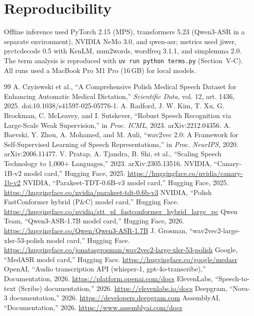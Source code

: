 \documentclass[conference]{IEEEtran}
\begin{document}
\section*{Reproducibility}
Offline inference used PyTorch 2.15 (MPS), transformers 5.23 (Qwen3-ASR in a separate environment), NVIDIA NeMo 3.0, and qwen-asr; metrics used jiwer, pyctcdecode 0.5 with KenLM, num2words, wordfreq 3.1.1, and simplemma 2.0. The term analysis is reproduced with \texttt{uv run python terms.py} (Section~V-C). All runs used a MacBook Pro M1 Pro (16\,GB) for local models.

\begin{thebibliography}{99}
 A. Czy\.zewski et al., ``A Comprehensive Polish Medical Speech Dataset for Enhancing Automatic Medical Dictation,'' \emph{Scientific Data}, vol. 12, art. 1436, 2025. doi:10.1038/s41597-025-05776-1.
 A. Radford, J. W. Kim, T. Xu, G. Brockman, C. McLeavey, and I. Sutskever, ``Robust Speech Recognition via Large-Scale Weak Supervision,'' in \emph{Proc. ICML}, 2023. arXiv:2212.04356.
 A. Baevski, Y. Zhou, A. Mohamed, and M. Auli, ``wav2vec 2.0: A Framework for Self-Supervised Learning of Speech Representations,'' in \emph{Proc. NeurIPS}, 2020. arXiv:2006.11477.
 V. Pratap, A. Tjandra, B. Shi, et al., ``Scaling Speech Technology to 1,000+ Languages,'' 2023. arXiv:2305.13516.
 NVIDIA, ``Canary-1B-v2 model card,'' Hugging Face, 2025. \url{https://huggingface.co/nvidia/canary-1b-v2}
 NVIDIA, ``Parakeet-TDT-0.6B-v3 model card,'' Hugging Face, 2025. \url{https://huggingface.co/nvidia/parakeet-tdt-0.6b-v3}
 NVIDIA, ``Polish FastConformer hybrid (P\&C) model card,'' Hugging Face. \url{https://huggingface.co/nvidia/stt_pl_fastconformer_hybrid_large_pc}
 Qwen Team, ``Qwen3-ASR-1.7B model card,'' Hugging Face, 2026. \url{https://huggingface.co/Qwen/Qwen3-ASR-1.7B}
 J. Grosman, ``wav2vec2-large-xlsr-53-polish model card,'' Hugging Face. \url{https://huggingface.co/jonatasgrosman/wav2vec2-large-xlsr-53-polish}
 Google, ``MedASR model card,'' Hugging Face. \url{https://huggingface.co/google/medasr}
 OpenAI, ``Audio transcription API (whisper-1, gpt-4o-transcribe),'' Documentation, 2026. \url{https://platform.openai.com/docs}
 ElevenLabs, ``Speech-to-text (Scribe) documentation,'' 2026. \url{https://elevenlabs.io/docs}
 Deepgram, ``Nova-3 documentation,'' 2026. \url{https://developers.deepgram.com}
 AssemblyAI, ``Documentation,'' 2026. \url{https://www.assemblyai.com/docs}

\end{thebibliography}
\end{document}
